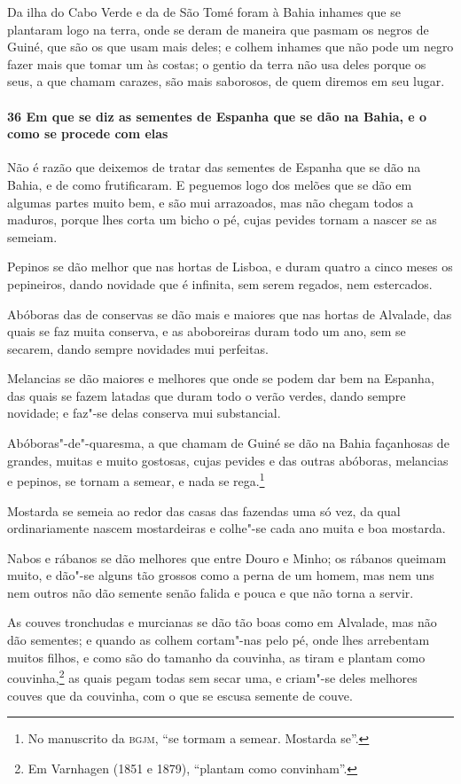 Da ilha do Cabo Verde e da de São Tomé foram à Bahia inhames que se plantaram logo na
terra, onde se deram de maneira que pasmam os negros de Guiné, que são os que usam mais
deles; e colhem inhames que não pode um negro fazer mais que tomar um às costas; o gentio
da terra não usa deles porque os seus, a que chamam carazes, são mais saborosos, de quem
diremos em seu lugar.

\paragraph{36 Em que se diz as sementes de Espanha que se dão na Bahia, e o como se
procede com elas}

Não é razão que deixemos de tratar das sementes de Espanha que se dão na Bahia, e de como
frutificaram. E peguemos logo dos melões que se dão em algumas partes muito bem, e são mui
arrazoados, mas não chegam todos a maduros, porque lhes corta um bicho o pé, cujas pevides
tornam a nascer se as semeiam.

Pepinos se dão melhor que nas hortas de Lisboa, e duram quatro a cinco meses os
pepineiros, dando novidade que é infinita, sem serem regados, nem estercados.

Abóboras das de conservas se dão mais e maiores que nas hortas de Alvalade, das quais se
faz muita conserva, e as aboboreiras duram todo um ano, sem se secarem, dando sempre
novidades mui perfeitas.

Melancias se dão maiores e melhores que onde se podem dar bem na Espanha, das quais se
fazem latadas que duram todo o verão verdes, dando sempre novidade; e faz"-se delas
conserva mui substancial.

Abóboras"-de"-quaresma, a que chamam de Guiné se dão na Bahia façanhosas de grandes, muitas
e muito gostosas, cujas pevides e das outras abóboras, melancias e pepinos, se tornam a
semear, e nada se rega.\footnote{ No manuscrito da \textsc{bgjm}, ``se tormam a semear.
Mostarda se''.}

Mostarda se semeia ao redor das casas das fazendas uma só vez, da qual ordinariamente
nascem mostardeiras e colhe"-se cada ano muita e boa mostarda.

Nabos e rábanos se dão melhores que entre Douro e Minho; os rábanos queimam muito, e
dão"-se alguns tão grossos como a perna de um homem, mas nem uns nem outros não dão semente
senão falida e pouca e que não torna a servir.

As couves tronchudas e murcianas se dão tão boas como em Alvalade, mas não dão sementes; e
quando as colhem cortam"-nas pelo pé, onde lhes arrebentam muitos filhos, e como são do
tamanho da couvinha, as tiram e plantam como couvinha,\footnote{ Em Varnhagen (1851 e
1879), ``plantam como convinham''.} as quais pegam todas sem secar uma, e criam"-se deles
melhores couves que da couvinha, com o que se escusa semente de couve.

